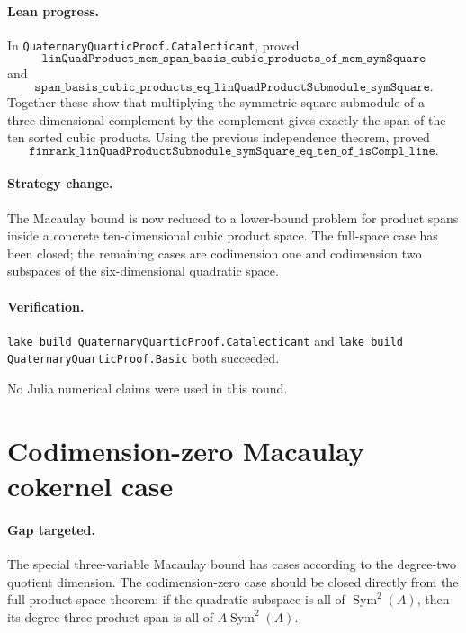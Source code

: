 \documentclass[11pt]{article}
\begin{document}
\paragraph{Lean progress.}
In \texttt{QuaternaryQuarticProof.Catalecticant}, proved
\[
\texttt{linQuadProduct\_mem\_span\_basis\_cubic\_products\_of\_mem\_symSquare}
\]
and
\[
\texttt{span\_basis\_cubic\_products\_eq\_linQuadProductSubmodule\_symSquare}.
\]
Together these show that multiplying the symmetric-square submodule of a
three-dimensional complement by the complement gives exactly the span of the
ten sorted cubic products.  Using the previous independence theorem, proved
\[
\texttt{finrank\_linQuadProductSubmodule\_symSquare\_eq\_ten\_of\_isCompl\_line}.
\]

\paragraph{Strategy change.}
The Macaulay bound is now reduced to a lower-bound problem for product spans
inside a concrete ten-dimensional cubic product space.  The full-space case
has been closed; the remaining cases are codimension one and codimension two
subspaces of the six-dimensional quadratic space.

\paragraph{Verification.}
\texttt{lake build QuaternaryQuarticProof.Catalecticant} and
\texttt{lake build QuaternaryQuarticProof.Basic} both succeeded.

No Julia numerical claims were used in this round.

\section*{Codimension-zero Macaulay cokernel case}

\paragraph{Gap targeted.}
The special three-variable Macaulay bound has cases according to the
degree-two quotient dimension.  The codimension-zero case should be closed
directly from the full product-space theorem: if the quadratic subspace is all
of \(\operatorname{Sym}^2(A)\), then its degree-three product span is all of
\(A\operatorname{Sym}^2(A)\).
\end{document}
